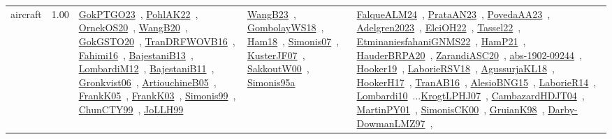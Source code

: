 {\begin{longtable}{p{3cm}r>{\raggedright\arraybackslash}p{6cm}>{\raggedright\arraybackslash}p{6cm}>{\raggedright\arraybackslash}p{8cm}}
\index{aircraft}\index{ApplicationAreas!aircraft}aircraft &  1.00 & \href{../works/GokPTGO23.pdf}{GokPTGO23}~\cite{GokPTGO23}, \href{../works/PohlAK22.pdf}{PohlAK22}~\cite{PohlAK22}, \href{../works/OrnekOS20.pdf}{OrnekOS20}~\cite{OrnekOS20}, \href{../works/WangB20.pdf}{WangB20}~\cite{WangB20}, \href{../works/GokGSTO20.pdf}{GokGSTO20}~\cite{GokGSTO20}, \href{../works/TranDRFWOVB16.pdf}{TranDRFWOVB16}~\cite{TranDRFWOVB16}, \href{../works/Fahimi16.pdf}{Fahimi16}~\cite{Fahimi16}, \href{../works/BajestaniB13.pdf}{BajestaniB13}~\cite{BajestaniB13}, \href{../works/LombardiM12.pdf}{LombardiM12}~\cite{LombardiM12}, \href{../works/BajestaniB11.pdf}{BajestaniB11}~\cite{BajestaniB11}, \href{../works/Gronkvist06.pdf}{Gronkvist06}~\cite{Gronkvist06}, \href{../works/ArtiouchineB05.pdf}{ArtiouchineB05}~\cite{ArtiouchineB05}, \href{../works/FrankK05.pdf}{FrankK05}~\cite{FrankK05}, \href{../works/FrankK03.pdf}{FrankK03}~\cite{FrankK03}, \href{../works/Simonis99.pdf}{Simonis99}~\cite{Simonis99}, \href{../works/ChunCTY99.pdf}{ChunCTY99}~\cite{ChunCTY99}, \href{../works/JoLLH99.pdf}{JoLLH99}~\cite{JoLLH99} & \href{../works/WangB23.pdf}{WangB23}~\cite{WangB23}, \href{../works/GombolayWS18.pdf}{GombolayWS18}~\cite{GombolayWS18}, \href{../works/Ham18.pdf}{Ham18}~\cite{Ham18}, \href{../works/Simonis07.pdf}{Simonis07}~\cite{Simonis07}, \href{../works/KusterJF07.pdf}{KusterJF07}~\cite{KusterJF07}, \href{../works/SakkoutW00.pdf}{SakkoutW00}~\cite{SakkoutW00}, \href{../works/Simonis95a.pdf}{Simonis95a}~\cite{Simonis95a} & \href{../works/FalqueALM24.pdf}{FalqueALM24}~\cite{FalqueALM24}, \href{../works/PrataAN23.pdf}{PrataAN23}~\cite{PrataAN23}, \href{../works/PovedaAA23.pdf}{PovedaAA23}~\cite{PovedaAA23}, \href{../works/Adelgren2023.pdf}{Adelgren2023}~\cite{Adelgren2023}, \href{../works/ElciOH22.pdf}{ElciOH22}~\cite{ElciOH22}, \href{../works/Tassel22.pdf}{Tassel22}~\cite{Tassel22}, \href{../works/EtminaniesfahaniGNMS22.pdf}{EtminaniesfahaniGNMS22}~\cite{EtminaniesfahaniGNMS22}, \href{../works/HamP21.pdf}{HamP21}~\cite{HamP21}, \href{../works/HauderBRPA20.pdf}{HauderBRPA20}~\cite{HauderBRPA20}, \href{../works/ZarandiASC20.pdf}{ZarandiASC20}~\cite{ZarandiASC20}, \href{../works/abs-1902-09244.pdf}{abs-1902-09244}~\cite{abs-1902-09244}, \href{../works/Hooker19.pdf}{Hooker19}~\cite{Hooker19}, \href{../works/LaborieRSV18.pdf}{LaborieRSV18}~\cite{LaborieRSV18}, \href{../works/AgussurjaKL18.pdf}{AgussurjaKL18}~\cite{AgussurjaKL18}, \href{../works/HookerH17.pdf}{HookerH17}~\cite{HookerH17}, \href{../works/TranAB16.pdf}{TranAB16}~\cite{TranAB16}, \href{../works/AlesioBNG15.pdf}{AlesioBNG15}~\cite{AlesioBNG15}, \href{../works/LaborieR14.pdf}{LaborieR14}~\cite{LaborieR14}, \href{../works/Lombardi10.pdf}{Lombardi10}~\cite{Lombardi10}...\href{../works/KrogtLPHJ07.pdf}{KrogtLPHJ07}~\cite{KrogtLPHJ07}, \href{../works/CambazardHDJT04.pdf}{CambazardHDJT04}~\cite{CambazardHDJT04}, \href{../works/MartinPY01.pdf}{MartinPY01}~\cite{MartinPY01}, \href{../works/SimonisCK00.pdf}{SimonisCK00}~\cite{SimonisCK00}, \href{../works/GruianK98.pdf}{GruianK98}~\cite{GruianK98}, \href{../works/Darby-DowmanLMZ97.pdf}{Darby-DowmanLMZ97}~\cite{Darby-DowmanLMZ97}, 
\end{longtable}}
